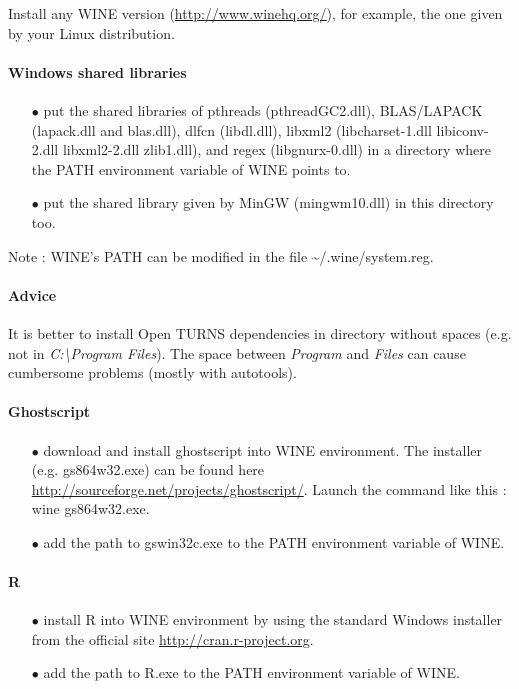 \documentclass[11pt]{article}
\begin{document}
Install any WINE version (\url{http://www.winehq.org/}), for example, the one given by your Linux distribution.


\paragraph{Windows shared libraries}

\begin{itemize}
\item[$\bullet$]  put the shared libraries of pthreads (pthreadGC2.dll), BLAS/LAPACK (lapack.dll and blas.dll), dlfcn (libdl.dll), libxml2 (libcharset-1.dll libiconv-2.dll libxml2-2.dll zlib1.dll), and regex (libgnurx-0.dll) in a directory where the PATH environment variable of WINE points to.
\item[$\bullet$]  put the shared library given by MinGW (mingwm10.dll) in this directory too.
\end{itemize}

Note : WINE's PATH can be modified in the file \textasciitilde{}/.wine/system.reg.


\paragraph{Advice}

It is better to install Open TURNS dependencies in directory without spaces (e.g. not in \emph{C:\textbackslash Program Files}).
The space between \emph{Program} and \emph{Files} can cause cumbersome problems (mostly with autotools).

\paragraph{Ghostscript}
\begin{itemize}
\item[$\bullet$]  download and install ghostscript into WINE environment. The installer (e.g. gs864w32.exe) can be found here \url{http://sourceforge.net/projects/ghostscript/}. Launch the command like this : wine gs864w32.exe.
\item[$\bullet$]  add the path to gswin32c.exe to the PATH environment variable of WINE.
\end{itemize}

\paragraph{R}
\begin{itemize}
\item[$\bullet$]  install R into WINE environment by using the standard Windows installer from the official site \url{http://cran.r-project.org}.
\item[$\bullet$]  add the path to R.exe to the PATH environment variable of WINE.
\end{itemize}
\end{document}
